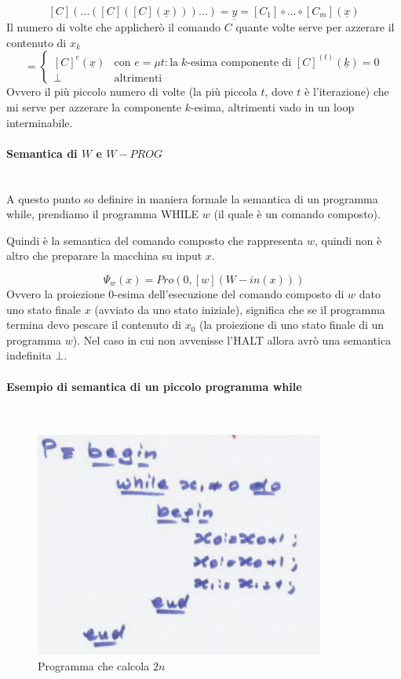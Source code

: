 \documentclass{article}
\begin{document}
\begin{itemize}
\begin{itemize}
                    $$[C](\dots([C]([C](\underline{x})))\dots)=\underline{y}=[C_1]\circ\dots\circ[C_m](\underline{x})$$
                    Il numero di volte che applicherò il comando $C$ quante volte serve per azzerare il contenuto di $x_k$
                    \[
                        =
                        \begin{cases}
                            [C]^e(\underline{x}) & \text{con }e=\mu t :\text{la}\;k\text{-esima componente di }[C]^{(t)}(\underline{k})=0 \\
                            \bot                 & \text{altrimenti}
                        \end{cases}
                    \]
                    Ovvero il più piccolo numero di volte (la più piccola $t$, dove $t$ è l'iterazione) che mi serve
                    per azzerare la componente $k$-esima, altrimenti vado in un loop interminabile.
          \end{itemize}
\end{itemize}

\paragraph{Semantica di $W$ e $W-PROG$}\mbox{}\\
A questo punto so definire in maniera formale la semantica
di un programma while, prendiamo il programma WHILE $w$ (il quale è un comando composto).

Quindi è la semantica del comando composto che rappresenta $w$, quindi non è altro che preparare
la macchina su input $x$.

$$\Psi_w(x)=Pro(0,[w](W-in(x)))$$
Ovvero la proiezione $0$-esima dell'esecuzione del comando composto di $w$ dato uno stato finale $x$ (avviato
da uno stato iniziale),
significa che se il programma termina devo pescare il contenuto di $x_0$ (la proiezione di uno stato finale
di un programma $w$).
Nel caso in cui non avvenisse l'HALT allora avrò una semantica indefinita $\bot$.

\paragraph{Esempio di semantica di un piccolo programma while}\mbox{}\\
\begin{figure}[H]
    \centering
    \includegraphics[scale=0.7]{images/smallprog.png}
    \caption{Programma che calcola $2n$}
\end{figure}
\end{document}
